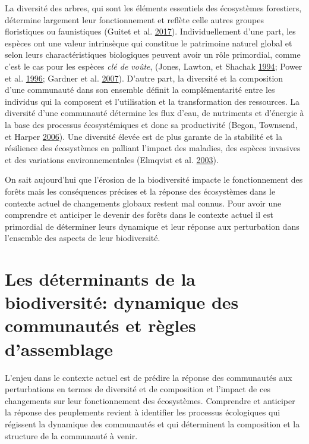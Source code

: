 \documentclass[11pt,french,A4paper,extrafontsizes,onecolumn,openright]{memoir}
\begin{document}
La diversité des arbres, qui sont les éléments essentiels des
écosystèmes forestiers, détermine largement leur fonctionnement et
reflète celle autres groupes floristiques ou faunistiques (Guitet et al.
\protect\hyperlink{ref-Guitet2017}{2017}). Individuellement d'une part,
les espèces ont une valeur intrinsèque qui constitue le patrimoine
naturel global et selon leurs charactéristiques biologiques peuvent
avoir un rôle primordial, comme c'est le cas pour les espèces \emph{clé
de voûte}, (Jones, Lawton, et Shachak
\protect\hyperlink{ref-Jones1994}{1994}; Power et al.
\protect\hyperlink{ref-Power1996}{1996}; Gardner et al.
\protect\hyperlink{ref-Gardner2007}{2007}). D'autre part, la diversité
et la composition d'une communauté dans son ensemble définit la
complémentarité entre les individus qui la composent et l'utilisation et
la transformation des ressources. La diversité d'une communauté
détermine les flux d'eau, de nutriments et d'énergie à la base des
processus écosystémiques et donc sa productivité (Begon, Townsend, et
Harper \protect\hyperlink{ref-Begon2006}{2006}). Une diversité élevée
est de plus garante de la stabilité et la résilience des écosystèmes en
palliant l'impact des maladies, des espèces invasives et des variations
environnementales (Elmqvist et al.
\protect\hyperlink{ref-Elmqvist2003}{2003}).

On sait aujourd'hui que l'érosion de la biodiversité impacte le
fonctionnement des forêts mais les conséquences précises et la réponse
des écosystèmes dans le contexte actuel de changements globaux restent
mal connus. Pour avoir une comprendre et anticiper le devenir des forêts
dans le contexte actuel il est primordial de déterminer leurs dynamique
et leur réponse aux perturbation dans l'ensemble des aspects de leur
biodiversité.

\section{Les déterminants de la biodiversité: dynamique des communautés
et règles
d'assemblage}\label{les-determinants-de-la-biodiversite-dynamique-des-communautes-et-regles-dassemblage}

L'enjeu dans le contexte actuel est de prédire la réponse des
communautés aux perturbations en termes de diversité et de composition
et l'impact de ces changements sur leur fonctionnement des écosystèmes.
Comprendre et anticiper la réponse des peuplements revient à identifier
les processus écologiques qui régissent la dynamique des communautés et
qui déterminent la composition et la structure de la communauté à venir.
\end{document}
